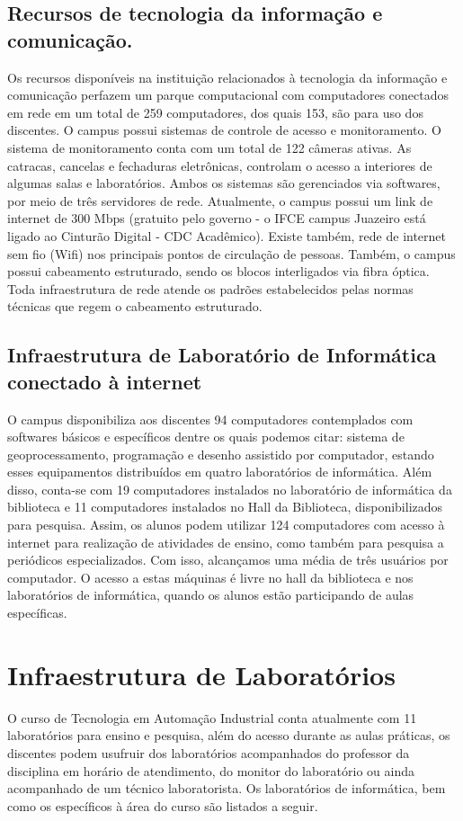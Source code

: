 \subsection{Recursos de tecnologia da informação e comunicação.}
Os recursos disponíveis na instituição relacionados à tecnologia da informação e comunicação perfazem um parque computacional com computadores conectados em rede em um total de 259 computadores, dos quais 153, são para uso dos discentes. O campus possui sistemas de controle de acesso e monitoramento. O sistema de monitoramento conta com um total de 122 câmeras ativas. As catracas, cancelas e fechaduras eletrônicas, controlam o acesso a interiores de algumas salas e laboratórios. Ambos os sistemas são gerenciados via softwares, por meio de três servidores de rede. Atualmente, o campus possui um link de internet de 300 Mbps (gratuito pelo governo - o IFCE campus Juazeiro está ligado ao Cinturão Digital - CDC Acadêmico). Existe também, rede de internet sem fio (Wifi) nos principais pontos de circulação de pessoas. Também, o campus possui cabeamento estruturado, sendo os blocos interligados via fibra óptica. Toda infraestrutura de rede atende os padrões estabelecidos pelas normas técnicas que regem o cabeamento estruturado.\\

\subsection{Infraestrutura de Laboratório de Informática conectado à internet}

O campus disponibiliza aos discentes 94 computadores contemplados com softwares básicos e específicos dentre os quais podemos citar: sistema de geoprocessamento, programação e desenho assistido por computador, estando esses equipamentos distribuídos em quatro laboratórios de informática. Além disso, conta-se com 19 computadores instalados no laboratório de informática da biblioteca e 11 computadores instalados no Hall da Biblioteca, disponibilizados para pesquisa. Assim, os alunos podem utilizar 124 computadores com acesso à internet para realização de atividades de ensino, como também para pesquisa a periódicos especializados. Com isso, alcançamos uma média de três usuários por computador. O acesso a estas máquinas é livre no hall da biblioteca e nos laboratórios de informática, quando os alunos estão participando de aulas específicas.\\

\section{Infraestrutura de Laboratórios}
O curso de Tecnologia em Automação Industrial conta atualmente com 11 laboratórios para ensino e pesquisa, além do acesso durante as aulas práticas, os discentes podem usufruir dos laboratórios acompanhados do professor da disciplina em horário de atendimento, do monitor do laboratório ou ainda acompanhado de um técnico laboratorista. Os laboratórios de informática, bem como os específicos à
área do curso são listados a seguir.\\

